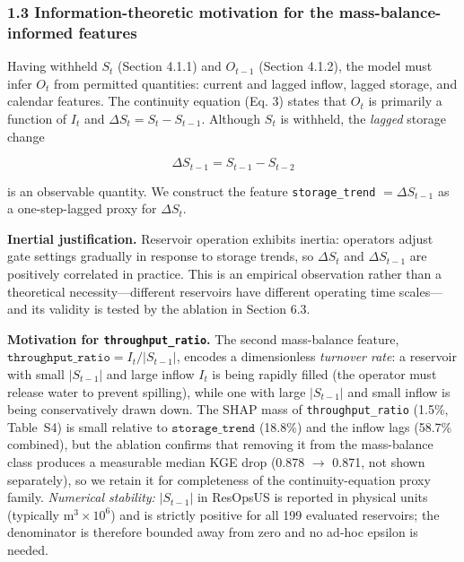 \documentclass[journal]{ascelike-new}
\begin{document}
\subsubsection{1.3 Information-theoretic motivation for the mass-balance-informed features}


Having withheld $S_t$ (Section 4.1.1) and $O_{t-1}$ (Section 4.1.2), the model must infer $O_t$ from permitted quantities: current and lagged inflow, lagged storage, and calendar features. The continuity equation (Eq. 3) states that $O_t$ is primarily a function of $I_t$ and $\Delta S_t = S_t - S_{t-1}$. Although $S_t$ is withheld, the \emph{lagged} storage change


\begin{equation}\Delta S_{t-1} = S_{t-1} - S_{t-2} \tag{6}\end{equation}


is an observable quantity. We construct the feature \texttt{storage\_trend} $= \Delta S_{t-1}$ as a one-step-lagged proxy for $\Delta S_t$.


\textbf{Inertial justification.} Reservoir operation exhibits inertia: operators adjust gate settings gradually in response to storage trends, so $\Delta S_t$ and $\Delta S_{t-1}$ are positively correlated in practice. This is an empirical observation rather than a theoretical necessity---different reservoirs have different operating time scales---and its validity is tested by the ablation in Section 6.3.

\textbf{Motivation for \texttt{throughput\_ratio}.} The second mass-balance feature, $\texttt{throughput\_ratio} = I_t / |S_{t-1}|$, encodes a dimensionless \emph{turnover rate}: a reservoir with small $|S_{t-1}|$ and large inflow $I_t$ is being rapidly filled (the operator must release water to prevent spilling), while one with large $|S_{t-1}|$ and small inflow is being conservatively drawn down. The SHAP mass of \texttt{throughput\_ratio} (1.5\%, Table~S4) is small relative to $\texttt{storage\_trend}$ (18.8\%) and the inflow lags (58.7\% combined), but the ablation confirms that removing it from the mass-balance class produces a measurable median KGE drop (0.878 $\to$ 0.871, not shown separately), so we retain it for completeness of the continuity-equation proxy family. \emph{Numerical stability:} $|S_{t-1}|$ in ResOpsUS is reported in physical units (typically $\mathrm{m}^3 \times 10^6$) and is strictly positive for all 199 evaluated reservoirs; the denominator is therefore bounded away from zero and no ad-hoc epsilon is needed.
\end{document}
